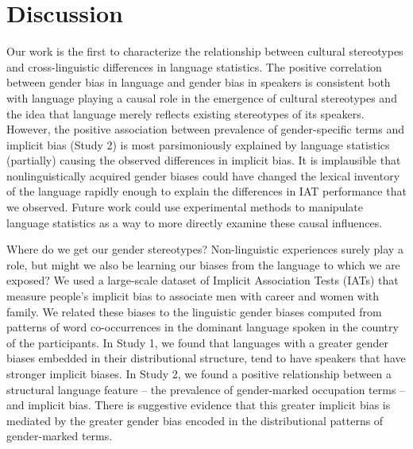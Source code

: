 \documentclass[9pt,twocolumn,twoside]{pnas-new}
\begin{document}
\section*{Discussion}\label{general-discussion}

Our work is the first to characterize the relationship between cultural stereotypes and cross-linguistic differences in language statistics. The positive correlation between gender bias in language and gender bias in speakers is consistent both with language playing a causal role in the emergence of cultural stereotypes and the idea that language merely reflects existing stereotypes of its speakers. However, the positive association between prevalence of gender-specific terms and implicit bias (Study 2) is most parsimoniously explained by language statistics (partially) causing the observed differences in implicit bias. It is implausible that nonlinguistically acquired gender biases could have changed the lexical inventory of the language rapidly enough to explain the differences in IAT performance that we observed. Future work could use experimental methods to manipulate language statistics as a way to more directly examine these causal influences.

Where do we get our gender stereotypes? Non-linguistic experiences surely play a role, but might we also be learning our biases from the language to which we are exposed? We used a large-scale dataset of Implicit Association Tests (IATs) that measure people's implicit bias to associate men with career and women with family. We related these biases to the linguistic gender biases computed from patterns of word co-occurrences in the dominant language spoken in the country of the participants. In Study 1, we found that languages with a greater gender biases embedded in their distributional structure, tend to have speakers that have stronger implicit biases. In Study 2, we found a positive relationship between a structural language feature – the prevalence of gender-marked occupation terms – and implicit bias. There is suggestive evidence that this greater implicit bias is mediated by the greater gender bias encoded in the distributional patterns of gender-marked terms.
\end{document}
